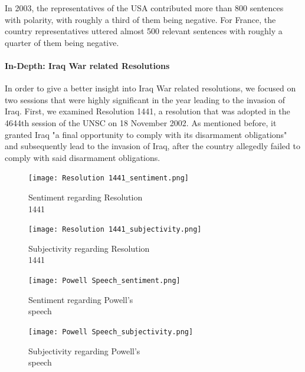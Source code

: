 In 2003, the representatives of the USA contributed more than 800 sentences with polarity, with roughly a third of them being negative. 
For France, the country representatives uttered almost 500 relevant sentences with roughly a quarter of them being negative.

\paragraph{In-Depth: Iraq War related Resolutions}
In order to give a better insight into Iraq War related resolutions, we focused on two sessions that were highly significant in the year leading to the invasion of Iraq. First, we examined Resolution 1441, a resolution that was adopted in the 4644th session of the UNSC on 18 November 2002. As mentioned before, it granted Iraq "a final opportunity to comply with its disarmament obligations" \citep{resolution1441} and subsequently lead to the invasion of Iraq, after the country allegedly failed to comply with said disarmament obligations.
\begin{figure}[h]
    \centering
    \begin{minipage}{0.47\textwidth}
        \centering
        \texttt{[image: Resolution 1441\_sentiment.png]} %
        \caption{Sentiment regarding Resolution \\ 1441}
        \label{1441sent}
    \end{minipage}\hfill
    \begin{minipage}{0.47\textwidth}
        \centering
        \texttt{[image: Resolution 1441\_subjectivity.png]} %
        \caption{Subjectivity regarding Resolution \\ 1441}
        \label{1441subj}
    \end{minipage}
\end{figure}
\begin{figure}[h]
    \centering
    \begin{minipage}{0.45\textwidth}
        \centering
        \texttt{[image: Powell Speech\_sentiment.png]} %
        \caption{Sentiment regarding Powell's \\ speech}
        \label{powellsent}
    \end{minipage}\hfill
    \begin{minipage}{0.45\textwidth}
        \centering
        \texttt{[image: Powell Speech\_subjectivity.png]} %
        \caption{Subjectivity regarding Powell's \\ speech}
        \label{powellsubj}
    \end{minipage}
\end{figure}

